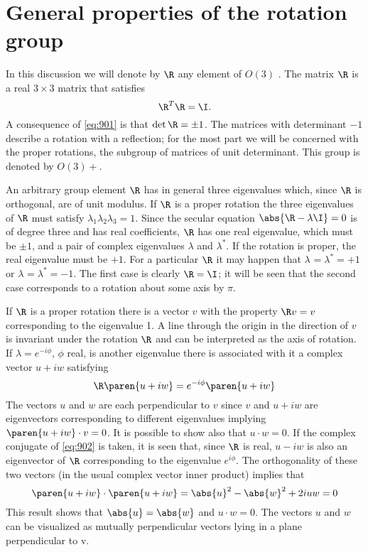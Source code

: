 \section{General properties of the rotation group	}

In this discussion we will denote by  $\R$ any element of  $O(3)$ . The matrix  $\R$ is a real  $3 \times 3$  matrix that satisfies
\begin{equation}
  \R^{T} \R = \I .
  \label{eq:901}
\end{equation}
A consequence of \eqref{eq:901} is that $\det \R = \pm 1$. The matrices with determinant $-1$ describe a rotation with a reflection; for the most part we will be concerned with the proper rotations, the subgroup of matrices of unit determinant. This group is denoted by $O(3)+$.

An arbitrary group element $\R$ has in general three eigenvalues which, since  $\R$ is orthogonal, are of unit modulus. If  $\R$ is a proper rotation the three eigenvalues of  $\R$ must satisfy $\lambda_{1} \lambda_{2} \lambda_{3} = 1$. Since the secular equation $\abs{\R - \lambda \I} = 0$ is of degree three and has real coefficients, $\R$ has one real eigenvalue, which must be $\pm 1$, and a pair of complex eigenvalues $\lambda$ and $\lambda^{*}$. If the rotation is proper, the real eigenvalue must be $+1$. For a particular  $\R$ it may happen that $\lambda^{} = \lambda^{*} = +1$ or $\lambda^{} = \lambda^{*} = -1$. The first case is clearly $\R = \I$; it will be seen that the second case corresponds to a rotation about some axis by $\pi$.

If  $\R$ is a proper rotation there is a vector $v$ with the property $\R v = v$ corresponding to the eigenvalue 1. A line through the origin in the direction of $v$ is invariant under the rotation  $\R$ and can be interpreted as the axis of rotation. If $\lambda = e^{-i \phi}$, $\phi$ real, is another eigenvalue there is associated with it a complex vector $u + i w$ satisfying
\begin{equation}
  \R \paren{u + i w} = e^{-i \phi} \paren{u + i w} 
  \label{eq:902}
\end{equation}
The vectors $u$ and $w$ are each perpendicular to $v$ since $v$ and $u + iw$ are eigenvectors corresponding to different eigenvalues implying $\paren{u + i w} \cdot v = 0$. It is possible to show also that $u \cdot w = 0$. If the complex conjugate of \eqref{eq:902} is taken, it is seen that, since  $\R$ is real, $u - iw$ is also an eigenvector of  $\R$ corresponding to the eigenvalue $e^{i \phi}$. The orthogonality of these two vectors (in the usual complex vector inner product) implies that 
\begin{equation*}
  \paren{u + i w} \cdot \paren{u + i w} = \abs{u}^{2} - \abs{w}^{2} + 2 i u w = 0
\end{equation*}
This result shows that $\abs{u} = \abs{w}$ and $u \cdot w = 0$. The vectors $u$ and $w$ can be visualized as mutually perpendicular vectors lying in a plane perpendicular to v.

